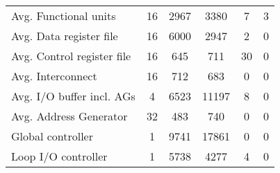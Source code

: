 \begin{table}
{\begin{tabular}{|l|c|c|c|c|c|}
            Avg. Functional units                                                           & \num{16} & \num{2967}   & \num{3380}   & \num{7}   & \num{3}  \\
            Avg. Data register file                                                         & \num{16} & \num{6000}   & \num{2947}   & \num{2}   & \num{0}  \\
            Avg. Control register file                                                      & \num{16} & \num{645}   & \num{711}    & \num{30}  & \num{0}  \\
            Avg. Interconnect                                                               & \num{16} & \num{712}   & \num{683}     & \num{0}   & \num{0}  \\ 
            Avg. I/O buffer incl. AGs                                                       & \num{4} & \num{6523}   & \num{11197}  & \num{8}   & \num{0}  \\
            Avg. Address Generator                                                          & \num{32} & \num{483}    & \num{740}    & \num{0}   & \num{0}  \\ 
            Global controller                                                               & \num{1} & \num{9741}   & \num{17861}  & \num{0}   & \num{0}  \\
            Loop I/O controller                                                             & \num{1} & \num{5738}   & \num{4277}   & \num{4}   & \num{0}  \\\hline
        \end{tabular}
    }
\end{table}
